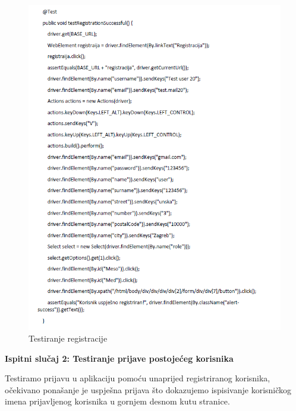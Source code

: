 			\begin{figure}[H]
				\includegraphics[scale=1.1]{slike/sel1.PNG} %
				\centering
				\caption{Testiranje registracije}
				\label{fig:sel1}
			\end{figure}
			
			
			
			
			
			\textbf{Ispitni slučaj 2: Testiranje prijave postojećeg korisnika
				}
			
			Testiramo prijavu u aplikaciju pomoću unaprijed registriranog korisnika, očekivano ponašanje je uspješna prijava što dokazujemo ispisivanje korisničkog imena prijavljenog korisnika u gornjem desnom kutu stranice.
			
